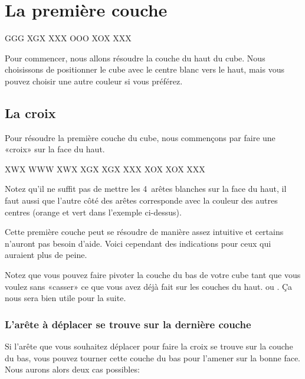 \chapter{La première couche}

{
\centering
{}
\RubikFaceRight%
{G}{G}{G}%
{X}{G}{X}%
{X}{X}{X}
\RubikFaceFront%
{O}{O}{O}%
{X}{O}{X}%
{X}{X}{X}
\par
}
\medskip

Pour commencer, nous allons résoudre la couche du haut du cube. Nous choisissons de positionner
le cube avec le centre blanc vers le haut, mais vous pouvez choisir une autre couleur si vous préférez.


\section{La croix}

Pour résoudre la première couche du cube, nous commençons
par faire une «croix» sur la face du haut.

\begin{center}
\RubikFaceUp%
{X}{W}{X}%
{W}{W}{W}%
{X}{W}{X}
\RubikFaceRight%
{X}{G}{X}%
{X}{G}{X}%
{X}{X}{X}
\RubikFaceFront%
{X}{O}{X}%
{X}{O}{X}%
{X}{X}{X}
\end{center}

Notez qu'il ne suffit pas de mettre les 4~arêtes blanches sur la face du haut, il faut aussi
que l'autre côté des arêtes corresponde avec la couleur des autres centres (orange et vert dans l'exemple ci-dessus).

Cette première couche peut se résoudre de manière assez intuitive et certains n'auront pas besoin
d'aide. Voici cependant des indications pour ceux qui auraient plus de peine.

Notez que vous pouvez faire pivoter la couche du bas de votre cube tant que vous voulez sans «casser» ce que vous avez déjà fait sur les couches du haut.  ou . Ça nous sera bien utile pour la suite.

\subsection{L'arête à déplacer se trouve sur la dernière couche}
\label{subsec:c1d}

Si l'arête que vous souhaitez déplacer pour faire la croix se trouve sur la couche du bas, vous pouvez tourner cette couche du bas pour l'amener sur la bonne face. Nous aurons alors deux cas possibles:

